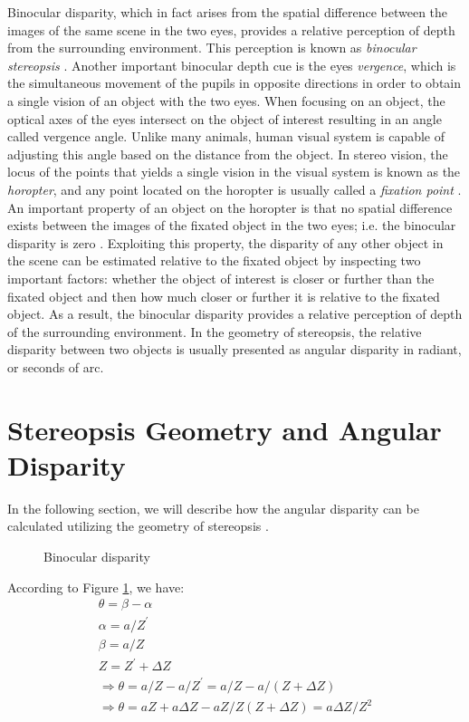 \documentclass[12pt]{report}
\begin{document}
Binocular disparity, which in fact arises from the spatial difference 
between the images of the same scene in the two eyes, provides a relative perception of depth from the surrounding environment. This perception is known as {\it binocular stereopsis} \cite{how95}. 
Another important binocular depth cue is the eyes {\it vergence}, which is the simultaneous movement of the pupils in opposite directions in order to obtain a single vision of an object with the
two eyes. When focusing on an object, the optical axes of the eyes intersect on the object of interest resulting in an angle called vergence angle. Unlike many animals, human visual system 
is capable of adjusting this angle based on the distance from the object.
In stereo vision, the locus of the points that yields a single vision in the visual system is known as the {\it horopter}, and any point located on the horopter is usually called a 
{\it fixation point} \cite{binr83,how95}.
An important property of an object on the horopter is that no spatial difference
exists between the images of the fixated object in the two eyes; i.e. the binocular disparity is zero \cite{how95}. 
Exploiting this property, the disparity of any other object in the scene can be estimated relative to the fixated object by inspecting two important factors: 
whether the object of interest is closer or further than the fixated object and then how much closer or further it is relative to the fixated object.
As a result, the binocular disparity provides a relative perception of depth of the surrounding environment.
In the geometry of stereopsis, the relative disparity between two objects is usually presented as angular disparity in radiant, or seconds of arc.

\section{Stereopsis Geometry and Angular Disparity}

In the following section, we will describe how the angular disparity can be calculated utilizing the geometry of stereopsis \cite{binr83}.

\begin{figure}[h!]
\centering

\caption{Binocular disparity}
\label{fig:stereopsis}
\end{figure} 

According to Figure \ref{fig:stereopsis}, we have:
\begin{align}
\theta = \beta - \alpha\\
\alpha = a/Z^{'}\\
\beta = a/Z\\
Z = Z^{'} + \Delta Z\\
\Rightarrow \theta = a/Z - a/Z^{'} = a/Z - a/(Z+\Delta Z) \\
\Rightarrow \theta = aZ+a\Delta Z-aZ/Z(Z+\Delta Z) = a\Delta Z/Z^{2} 
\end{align}
\end{document}

